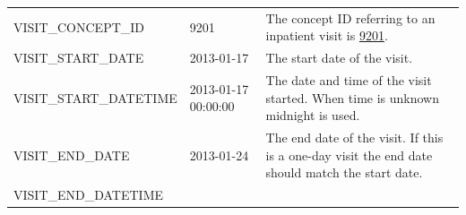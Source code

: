 \documentclass[11pt]{book}
\begin{document}
\begin{longtable}[]{@{}lll@{}}
\begin{minipage}[t]{0.27\columnwidth}\raggedright\strut
VISIT\_CONCEPT\_ID\strut
\end{minipage} & \begin{minipage}[t]{0.15\columnwidth}\raggedright\strut
9201\strut
\end{minipage} & \begin{minipage}[t]{0.49\columnwidth}\raggedright\strut
The concept ID referring to an inpatient visit is
\href{http://athena.ohdsi.org/search-terms/terms/9201}{9201}.\strut
\end{minipage}\tabularnewline
\begin{minipage}[t]{0.27\columnwidth}\raggedright\strut
VISIT\_START\_DATE\strut
\end{minipage} & \begin{minipage}[t]{0.15\columnwidth}\raggedright\strut
2013-01-17\strut
\end{minipage} & \begin{minipage}[t]{0.49\columnwidth}\raggedright\strut
The start date of the visit.\strut
\end{minipage}\tabularnewline
\begin{minipage}[t]{0.27\columnwidth}\raggedright\strut
VISIT\_START\_DATETIME\strut
\end{minipage} & \begin{minipage}[t]{0.15\columnwidth}\raggedright\strut
2013-01-17 00:00:00\strut
\end{minipage} & \begin{minipage}[t]{0.49\columnwidth}\raggedright\strut
The date and time of the visit started. When time is unknown midnight is
used.\strut
\end{minipage}\tabularnewline
\begin{minipage}[t]{0.27\columnwidth}\raggedright\strut
VISIT\_END\_DATE\strut
\end{minipage} & \begin{minipage}[t]{0.15\columnwidth}\raggedright\strut
2013-01-24\strut
\end{minipage} & \begin{minipage}[t]{0.49\columnwidth}\raggedright\strut
The end date of the visit. If this is a one-day visit the end date
should match the start date.\strut
\end{minipage}\tabularnewline
\begin{minipage}[t]{0.27\columnwidth}\raggedright\strut
VISIT\_END\_DATETIME\strut
\end{minipage} & \begin{minipage}[t]{0.15\columnwidth}\raggedright\strut

\end{minipage}
\end{longtable}
\end{document}
